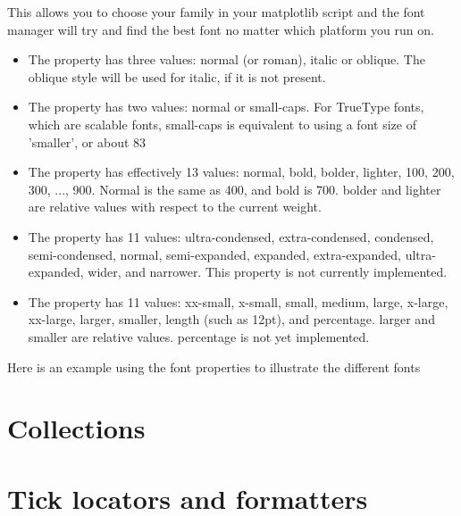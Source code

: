 \documentclass[twoside]{book}
\begin{document}
This allows you to choose your family in your matplotlib script and
the font manager will try and find the best font no matter which
platform you run on.

\begin{itemize}
\item The  property has three values: normal (or
  roman), italic or oblique.  The oblique style will be used for
  italic, if it is not present.
  
\item The  property has two values: normal or
  small-caps.  For TrueType fonts, which are scalable fonts,
  small-caps is equivalent to
  using a font size of 'smaller', or about 83%
  
\item The  property has effectively 13 values: normal,
  bold, bolder, lighter, 100, 200, 300, ..., 900.  Normal is the same
  as 400, and bold is 700.  bolder and lighter are relative values
  with respect to the current weight.

  
\item The  property has 11 values: ultra-condensed,
  extra-condensed, condensed, semi-condensed, normal, semi-expanded,
  expanded, extra-expanded, ultra-expanded, wider, and narrower.  This
  property is not currently implemented.
  
\item The  property has 11 values: xx-small, x-small,
  small, medium, large, x-large, xx-large, larger, smaller, length
  (such as 12pt), and percentage.  larger and smaller are relative
  values.  percentage is not yet implemented.

\end{itemize}

Here is an example using the font properties to illustrate the
different fonts








\chapter{Collections}
\label{cha:collections}


\chapter{Tick locators and formatters}
\label{cha:tickers}
\end{document}
